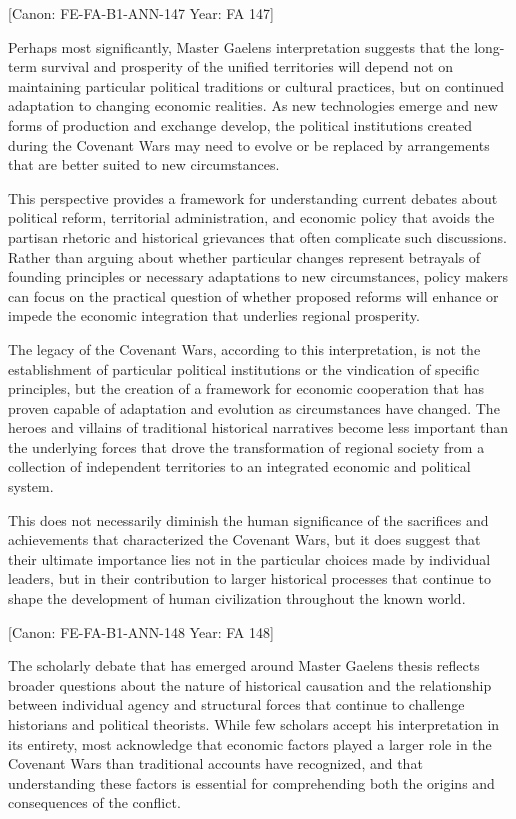 {[}Canon: FE-FA-B1-ANN-147 \textbar{} Year: FA 147{]}

Perhaps most significantly, Master Gaelen\textquotesingle s
interpretation suggests that the long-term survival and prosperity of
the unified territories will depend not on maintaining particular
political traditions or cultural practices, but on continued adaptation
to changing economic realities. As new technologies emerge and new forms
of production and exchange develop, the political institutions created
during the Covenant Wars may need to evolve or be replaced by
arrangements that are better suited to new circumstances.

This perspective provides a framework for understanding current debates
about political reform, territorial administration, and economic policy
that avoids the partisan rhetoric and historical grievances that often
complicate such discussions. Rather than arguing about whether
particular changes represent betrayals of founding principles or
necessary adaptations to new circumstances, policy makers can focus on
the practical question of whether proposed reforms will enhance or
impede the economic integration that underlies regional prosperity.

The legacy of the Covenant Wars, according to this interpretation, is
not the establishment of particular political institutions or the
vindication of specific principles, but the creation of a framework for
economic cooperation that has proven capable of adaptation and evolution
as circumstances have changed. The heroes and villains of traditional
historical narratives become less important than the underlying forces
that drove the transformation of regional society from a collection of
independent territories to an integrated economic and political system.

This does not necessarily diminish the human significance of the
sacrifices and achievements that characterized the Covenant Wars, but it
does suggest that their ultimate importance lies not in the particular
choices made by individual leaders, but in their contribution to larger
historical processes that continue to shape the development of human
civilization throughout the known world.

{[}Canon: FE-FA-B1-ANN-148 \textbar{} Year: FA 148{]}

The scholarly debate that has emerged around Master
Gaelen\textquotesingle s thesis reflects broader questions about the
nature of historical causation and the relationship between individual
agency and structural forces that continue to challenge historians and
political theorists. While few scholars accept his interpretation in its
entirety, most acknowledge that economic factors played a larger role in
the Covenant Wars than traditional accounts have recognized, and that
understanding these factors is essential for comprehending both the
origins and consequences of the conflict.


